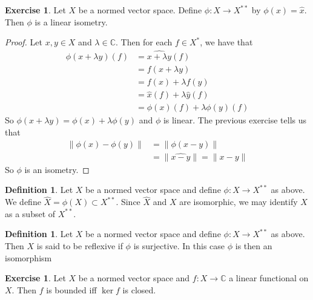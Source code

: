 \documentclass[12pt]{amsart}
\theoremstyle{definition}
\newtheorem{defn}[definition]{Definition}
\theoremstyle{remark}
\theoremstyle{definition}
\newtheorem{ex}[definition]{Exercise}
\newcommand{\lam}{\lambda}
\newcommand{\C}{\mathbb{C}}
\begin{document}
	
	\begin{ex}
		Let $X$ be a normed vector space. Define $\phi : X \rightarrow X^{**}$ by $\phi(x) = \hat{x}$. Then $\phi$ is a linear isometry. 
	\end{ex}
	
	\begin{proof}
		Let $x,y \in X$ and $\lam \in \C$. Then for each $f \in X^*$, we have that 
		\begin{align*}
			\phi(x+ \lam y)(f) 
			&= \widehat{x+ \lam y}(f) \\
			&= f(x+\lam y) \\
			&= f(x) + \lam f(y) \\
			&= \hat{x}(f) + \lam \hat{y}(f)\\
			&= \phi(x)(f) + \lam \phi(y)(f)
		\end{align*} 
		So $\phi(x+ \lam y) = \phi(x) + \lam \phi(y)$ and $\phi$ is linear. The previous exercise tells us that 
		\begin{align*}
			\|\phi(x) - \phi(y) \|
			&= \|\phi(x-y)\|\\
			&= \|\widehat{x-y} \|= \|x-y \|
		\end{align*}
		So $\phi$ is an isometry.
	\end{proof}
	
	\begin{defn}
		Let $X$ be a normed vector space and define $\phi:X \rightarrow X^{**}$ as above. We define $\widehat{X} = \phi(X) \subset X^{**}$. Since $\widehat{X}$ and $X$ are isomorphic, we may identify $X$ as a subset of $X^{**}$. 
	\end{defn}
	
	\begin{defn}
		Let $X$ be a normed vector space and define $\phi:X \rightarrow X^{**}$ as above. Then $X$ is said to be reflexive if $\phi$ is surjective. In this case $\phi$ is then an isomorphism
	\end{defn}
	
	\begin{ex}
		Let $X$ be a normed vector space and $f:X \rightarrow \C$ a linear functional on $X$. Then $f$ is bounded iff $\ker f$ is closed. 
	\end{ex}
	
\end{document}
